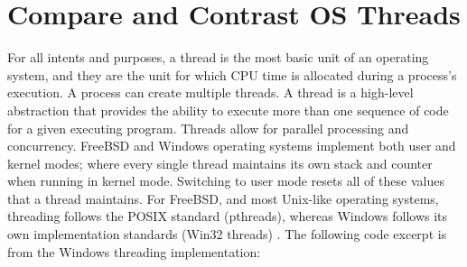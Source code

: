 \documentclass[letterpaper,10pt,draftclsnofoot,onecolumn]{IEEEtran}
\begin{document}
\section{Compare and Contrast OS Threads}
For all intents and purposes, a thread is the most basic unit of an operating system, and they are the unit for which CPU time is allocated during a process’s execution. A process can create multiple threads. A thread is a high-level abstraction that provides the ability to execute more than one sequence of code for a given executing program. Threads allow for parallel processing and concurrency. FreeBSD and Windows operating systems implement both user and kernel modes; where every single thread maintains its own stack and counter when running in kernel mode. Switching to user mode resets all of these values that a thread maintains. For FreeBSD, and most Unix-like operating systems, threading follows the POSIX standard (pthreads), whereas Windows follows its own implementation standards (Win32 threads) \cite{MSWindows1} \cite{FreeBSD2}. The following code excerpt is from the Windows threading implementation: \cite{PsCreateSystemThread} \cite{MSWindows3} \\\\


\end{document}
